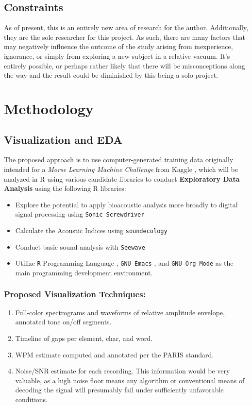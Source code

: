 \documentclass[11pt]{article}
\begin{document}
\subsection{Constraints}
\label{sec:orgc4ccdf6}
As of present, this is an entirely new area of research for the author. Additionally, they are the sole researcher for this project.
As such, there are many factors that may negatively influence the outcome of the study arising from inexperience, ignorance, or simply from
exploring a new subject in a relative vacuum. It's entirely possible, or perhaps rather likely that there will be misconceptions along the way
and the result could be diminished by this being a solo project.
\section{Methodology}
\label{sec:org7ed48ba}
\subsection{Visualization and EDA}
\label{sec:org3b98012}
The proposed approach is to use computer-generated training data originally intended for a \emph{Morse Learning Machine Challenge} from Kaggle \autocite{ag1le2014},
which will be analyzed in R using various candidate libraries to conduct \textbf{Exploratory Data Analysis} using the following R libraries:
\begin{itemize}
\item Explore the potential to apply bioacoustic analysis more broadly to digital signal processing using \texttt{Sonic Screwdriver} \autocite{ssdriverCran}
\item Calculate the Acoustic Indices using \texttt{soundecology} \autocite{soundecology}
\item Conduct basic sound analysis with \texttt{Seewave}  \autocite{seewaveCran}
\item Utilize \texttt{R} Programming Language \autocite{RLang}, \texttt{GNU Emacs} \autocite{emacs}, and \texttt{GNU Org Mode} \autocite{orgmode}
as the main programming development environment.
\end{itemize}
\subsubsection{Proposed Visualization Techniques:}
\label{sec:org5e8ddda}
\begin{enumerate}
\item Full-color spectrograms and waveforms of relative amplitude envelope, annotated tone on/off segments.
\item Timeline of gaps per element, char, and word.
\item WPM estimate computed and annotated per the PARIS standard.
\item Noise/SNR estimate for each recording.
This information would be very valuable, as a high noise floor means any algorithm or
conventional means of decoding the signal will presumably fail under sufficiently unfavorable conditions.
\end{enumerate}
\end{document}
